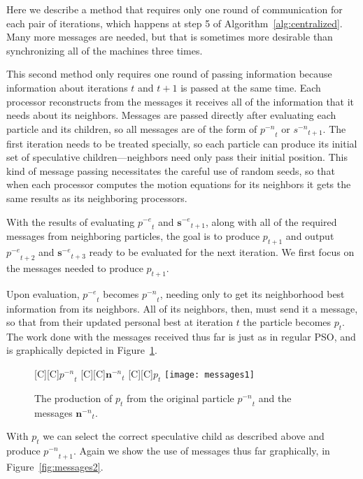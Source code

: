 \documentclass[journal,letterpaper]{IEEEtran}
\newcommand{\fig}[1]{Figure~\ref{fig:#1}}
\newcommand{\alg}[1]{Algorithm~\ref{alg:#1}}
\providecommand{\noeval}[1]{\ensuremath{#1^{-e}}}
\providecommand{\nonbest}[1]{\ensuremath{#1^{-n}}}
\providecommand{\p}{\ensuremath{p}}
\providecommand{\s}{\ensuremath{s}}
\providecommand{\sset}{\ensuremath{\mathbf{s}}}
\providecommand{\nset}{\ensuremath{\mathbf{n}}}
\begin{document}

Here we describe a method that requires only one round of communication for
each pair of iterations, which happens at step 5 of \alg{centralized}.  Many
more messages are needed, but that is sometimes more desirable than
synchronizing all of the machines three times.

This second method only requires one round of passing information because
information about iterations $t$ and $t+1$ is passed at the same time.  Each
processor reconstructs from the messages it receives all of the information
that it needs about its neighbors.  Messages are passed directly after
evaluating each particle and its children, so all messages are of the form of
$\nonbest{\p}_t$ or $\nonbest{\s}_{t+1}$.  The first iteration needs to be
treated specially, so each particle can produce its initial set of speculative
children---neighbors need only pass their initial position.  This kind of
message passing necessitates the careful use of random seeds, so that when each
processor computes the motion equations for its neighbors it gets the same
results as its neighboring processors.

With the results of evaluating $\noeval{\p}_t$ and $\noeval{\sset}_{t+1}$,
along with all of the required messages from neighboring particles, the goal is
to produce $\p_{t+1}$ and output $\noeval{\p}_{t+2}$ and $\noeval{\sset}_{t+3}$
ready to be evaluated for the next iteration.  We first focus on the messages
needed to produce $\p_{t+1}$.

Upon evaluation, $\noeval{\p}_t$ becomes $\nonbest{\p}_t$, needing only to get
its neighborhood best information from its neighbors.  All of its neighbors,
then, must send it a message, so that from their updated personal best at
iteration $t$ the particle becomes $\p_t$.  The work done with the messages
received thus far is just as in regular PSO, and is graphically depicted in 
\fig{messages1}.

\begin{figure}
  \centering
  [C][C]{$\nonbest{\p}_{t}$}
  [C][C]{$\nonbest{\nset}_{t}$}
  [C][C]{$\p_{t}$}
  \texttt{[image: messages1]}
  \caption{The production of $\p_{t}$ from the original particle
  $\nonbest{\p}_{t}$ and the messages $\nonbest{\nset}_{t}$.}
  \label{fig:messages1}
\end{figure}

With $\p_t$ we can select the correct speculative child as described above and
produce $\nonbest{\p}_{t+1}$.  Again we show the use of messages thus far
graphically, in \fig{messages2}.  
\end{document}
